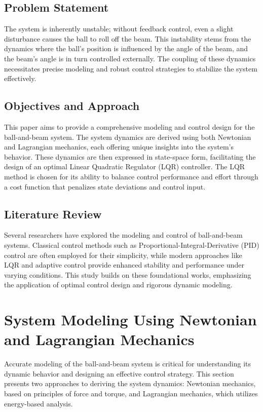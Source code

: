 \documentclass[conference]{IEEEtran}
\begin{document}
\subsection{Problem Statement}

The system is inherently unstable; without feedback control, even a slight disturbance causes the ball to roll off the beam. This instability stems from the dynamics where the ball's position is influenced by the angle of the beam, and the beam's angle is in turn controlled externally. The coupling of these dynamics necessitates precise modeling and robust control strategies to stabilize the system effectively.

\subsection{Objectives and Approach}

This paper aims to provide a comprehensive modeling and control design for the ball-and-beam system. The system dynamics are derived using both Newtonian and Lagrangian mechanics, each offering unique insights into the system's behavior. These dynamics are then expressed in state-space form, facilitating the design of an optimal Linear Quadratic Regulator (LQR) controller. The LQR method is chosen for its ability to balance control performance and effort through a cost function that penalizes state deviations and control input.

\subsection{Literature Review}

Several researchers have explored the modeling and control of ball-and-beam systems. Classical control methods such as Proportional-Integral-Derivative (PID) control are often employed for their simplicity, while modern approaches like LQR and adaptive control provide enhanced stability and performance under varying conditions. This study builds on these foundational works, emphasizing the application of optimal control design and rigorous dynamic modeling.



\section{System Modeling Using Newtonian and Lagrangian Mechanics}
Accurate modeling of the ball-and-beam system is critical for understanding its dynamic behavior and designing an effective control strategy. This section presents two approaches to deriving the system dynamics: Newtonian mechanics, based on principles of force and torque, and Lagrangian mechanics, which utilizes energy-based analysis.
\end{document}
